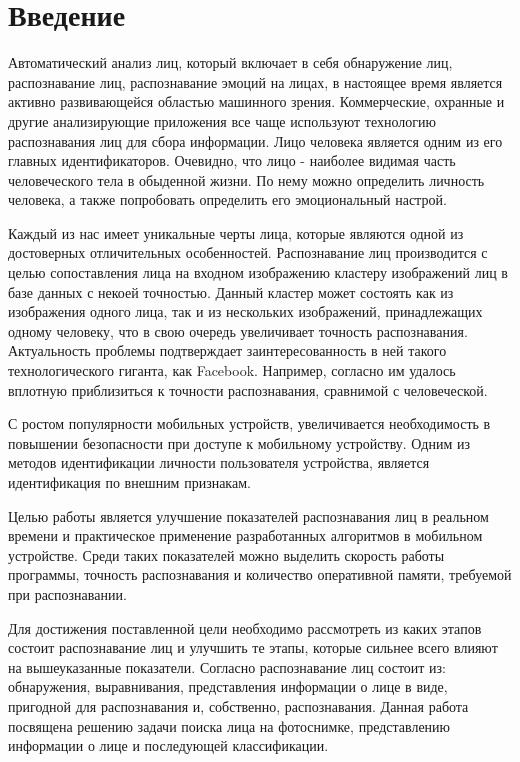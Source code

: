 \section{Введение}

Автоматический анализ лиц, который включает в себя обнаружение лиц,
распознавание лиц, распознавание эмоций на лицах, в настоящее время является активно развивающейся областью машинного зрения. Коммерческие,
охранные и другие анализирующие приложения все чаще используют технологию распознавания лиц для сбора информации. Лицо человека является
одним из его главных идентификаторов. Очевидно, что лицо - наиболее видимая часть человеческого тела в обыденной жизни. По нему можно
определить личность человека, а также попробовать определить его эмоциональный настрой.

Каждый из нас имеет уникальные черты лица, которые являются одной из достоверных отличительных особенностей. Распознавание
лиц производится с целью сопоставления лица на входном изображению кластеру изображений лиц в базе данных с некоей точностью. Данный кластер
может состоять как из изображения одного лица, так и из нескольких изображений, принадлежащих одному человеку, что в свою очередь увеличивает
точность распознавания. Актуальность проблемы подтверждает заинтересованность в ней такого технологического гиганта, как Facebook. Например,
согласно \cite{facebook} им удалось вплотную приблизиться к точности распознавания,
сравнимой с человеческой.

С ростом популярности мобильных устройств, увеличивается необходимость в повышении безопасности при доступе к мобильному устройству.
Одним из методов идентификации личности пользователя устройства, является идентификация по внешним признакам.

Целью работы является улучшение показателей распознавания лиц в реальном времени и практическое применение
разработанных алгоритмов в мобильном устройстве.
Среди таких показателей можно выделить скорость работы программы, точность распознавания и количество оперативной памяти,
требуемой при распознавании.

Для достижения поставленной цели необходимо рассмотреть из каких
этапов состоит распознавание лиц и улучшить те этапы, которые сильнее
всего влияют на вышеуказанные показатели. Согласно \cite{facebook} распознавание лиц
состоит из: обнаружения, выравнивания, представления информации о лице
в виде, пригодной для распознавания и, собственно, распознавания. Данная
работа посвящена решению задачи поиска лица на фотоснимке, представлению информации о лице
и последующей классификации.

